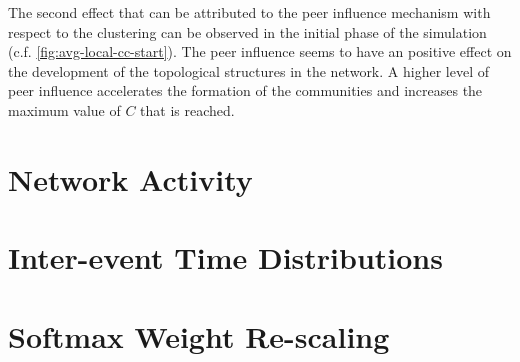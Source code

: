 The second effect that can be attributed to the peer influence mechanism with respect to the clustering can be observed in the initial phase of the simulation (c.f. \cref{fig:avg-local-cc-start}).
The peer influence seems to have an positive effect on the development of the topological structures in the network.
A higher level of peer influence accelerates the formation of the communities and increases the maximum value of \( C \) that is reached.




\section{Network Activity}
\label{sec:network-activity}




\section{Inter-event Time Distributions}
\label{sec:inter-event-time-dists}




\section{Softmax Weight Re-scaling}
\label{sec:softmax-rescaling}
